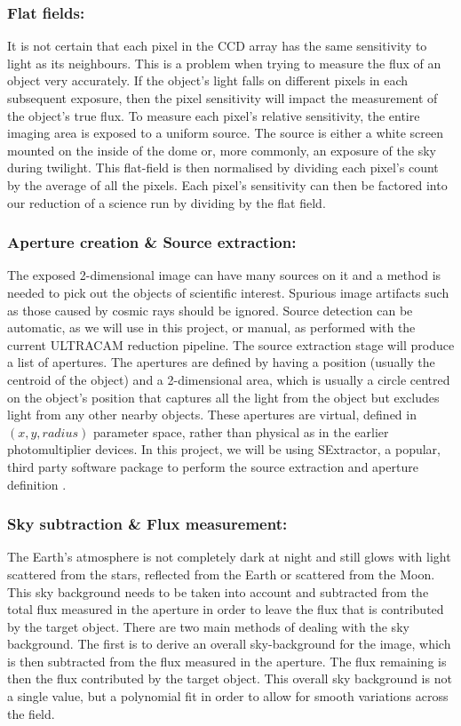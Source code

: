 \subsubsection{Flat fields:}
It is not certain that each pixel in the CCD array has the same sensitivity to light as its neighbours. This is a problem when trying to measure the flux of an object very accurately. If the object's light falls on different pixels in each subsequent exposure, then the pixel sensitivity will impact the measurement of the object's true flux. To measure each pixel's relative sensitivity, the entire imaging area is exposed to a uniform source. The source is either a white screen mounted on the inside of the dome or, more commonly, an exposure of the sky during twilight. This flat-field is then normalised by dividing each pixel's count by the average of all the pixels. Each pixel's sensitivity can then be factored into our reduction of a science run by dividing by the flat field. 

\subsubsection{Aperture creation \& Source extraction:}
The exposed 2-dimensional image can have many sources on it and a method is needed to pick out the objects of scientific interest. Spurious image artifacts such as those caused by cosmic rays should be ignored. Source detection can be automatic, as we will use in this project, or manual, as performed with the current ULTRACAM reduction pipeline. The source extraction stage will produce a list of apertures. The apertures are defined by having a position (usually the centroid of the object) and a 2-dimensional area, which is usually a circle centred on the object's position that captures all the light from the object but excludes light from any other nearby objects. These apertures are virtual, defined in $(x, y, radius)$ parameter space, rather than physical as in the earlier photomultiplier devices. In this project, we will be using {SExtractor}, a popular, third party software package to perform the source extraction and aperture definition \citep{bertin}.

\subsubsection{Sky subtraction \& Flux measurement:}
The Earth's atmosphere is not completely dark at night and still glows with light scattered from the stars, reflected from the Earth or scattered from the Moon. This sky background needs to be taken into account and subtracted from the total flux measured in the aperture in order to leave the flux that is contributed by the target object. There are two main methods of dealing with the sky background. The first is to derive an overall sky-background for the image, which is then subtracted from the flux measured in the aperture. The flux remaining is then the flux contributed by the target object. This overall sky background is not a single value, but a polynomial fit in order to allow for smooth variations across the field. 

